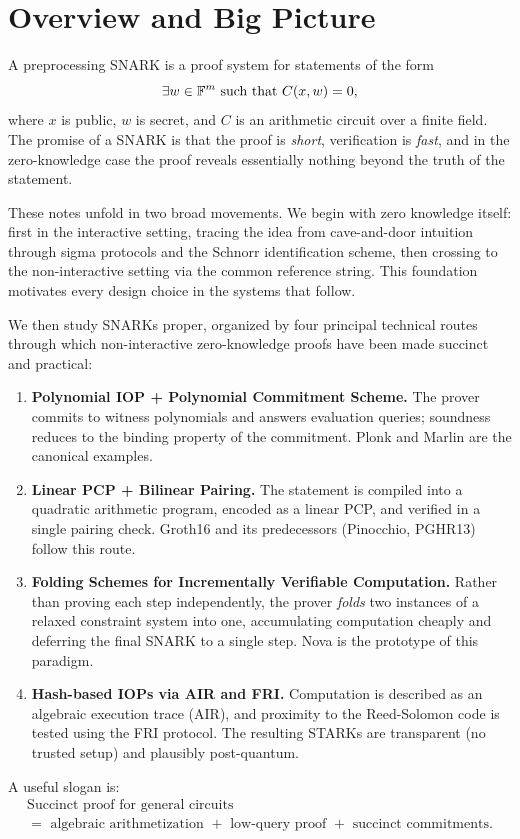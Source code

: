 \section{Overview and Big Picture}
\label{sec:overview}

A preprocessing SNARK is a proof system for statements of the form
\[
\exists w \in \mathbb{F}^m \text{ such that } C(x,w)=0,
\]
where $x$ is public, $w$ is secret, and $C$ is an arithmetic circuit over a finite field. The promise of a SNARK is that the proof is \emph{short}, verification is \emph{fast}, and in the zero-knowledge case the proof reveals essentially nothing beyond the truth of the statement.

These notes unfold in two broad movements. We begin with zero knowledge itself: first in the interactive setting, tracing the idea from cave-and-door intuition through sigma protocols and the Schnorr identification scheme, then crossing to the non-interactive setting via the common reference string. This foundation motivates every design choice in the systems that follow.

We then study SNARKs proper, organized by four principal technical routes through which non-interactive zero-knowledge proofs have been made succinct and practical:
\begin{enumerate}
    \item \textbf{Polynomial IOP + Polynomial Commitment Scheme.} The prover commits to witness polynomials and answers evaluation queries; soundness reduces to the binding property of the commitment. Plonk and Marlin are the canonical examples.
    \item \textbf{Linear PCP + Bilinear Pairing.} The statement is compiled into a quadratic arithmetic program, encoded as a linear PCP, and verified in a single pairing check. Groth16 and its predecessors (Pinocchio, PGHR13) follow this route.
    \item \textbf{Folding Schemes for Incrementally Verifiable Computation.} Rather than proving each step independently, the prover \emph{folds} two instances of a relaxed constraint system into one, accumulating computation cheaply and deferring the final SNARK to a single step. Nova is the prototype of this paradigm.
    \item \textbf{Hash-based IOPs via AIR and FRI.} Computation is described as an algebraic execution trace (AIR), and proximity to the Reed-Solomon code is tested using the FRI protocol. The resulting STARKs are transparent (no trusted setup) and plausibly post-quantum.
\end{enumerate}

A useful slogan is:
\[
\boxed{
\begin{array}{c}
\text{Succinct proof for general circuits}\\[0.2em]
=\text{ algebraic arithmetization }+\text{ low-query proof }+\text{ succinct commitments}.
\end{array}}
\]


